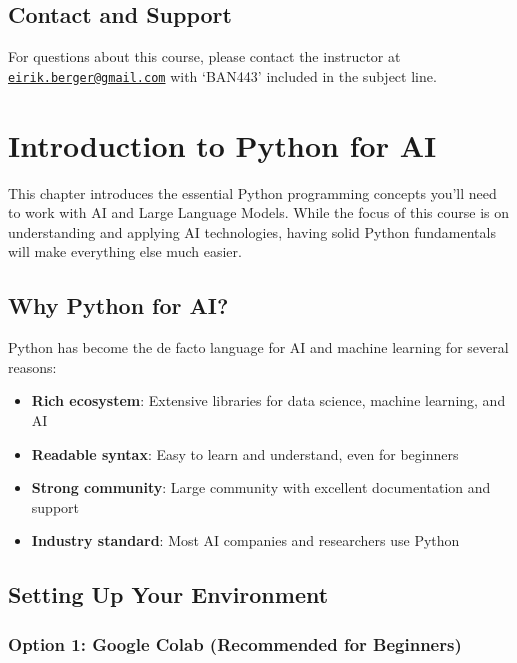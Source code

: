 \documentclass[
]{book}
\providecommand{\tightlist}{%
  \setlength{\itemsep}{0pt}\setlength{\parskip}{0pt}}
\begin{document}
\section{Contact and Support}\label{contact-and-support}

For questions about this course, please contact the instructor at \href{mailto:eirik.berger@gmail.com}{\nolinkurl{eirik.berger@gmail.com}} with `BAN443' included in the subject line.

\chapter{Introduction to Python for AI}\label{intro}

This chapter introduces the essential Python programming concepts you'll need to work with AI and Large Language Models. While the focus of this course is on understanding and applying AI technologies, having solid Python fundamentals will make everything else much easier.

\section{Why Python for AI?}\label{why-python-for-ai}

Python has become the de facto language for AI and machine learning for several reasons:

\begin{itemize}
\tightlist
\item
  \textbf{Rich ecosystem}: Extensive libraries for data science, machine learning, and AI
\item
  \textbf{Readable syntax}: Easy to learn and understand, even for beginners
\item
  \textbf{Strong community}: Large community with excellent documentation and support
\item
  \textbf{Industry standard}: Most AI companies and researchers use Python
\end{itemize}

\section{Setting Up Your Environment}\label{setting-up-your-environment}

\subsection{Option 1: Google Colab (Recommended for Beginners)}\label{option-1-google-colab-recommended-for-beginners}
\end{document}
